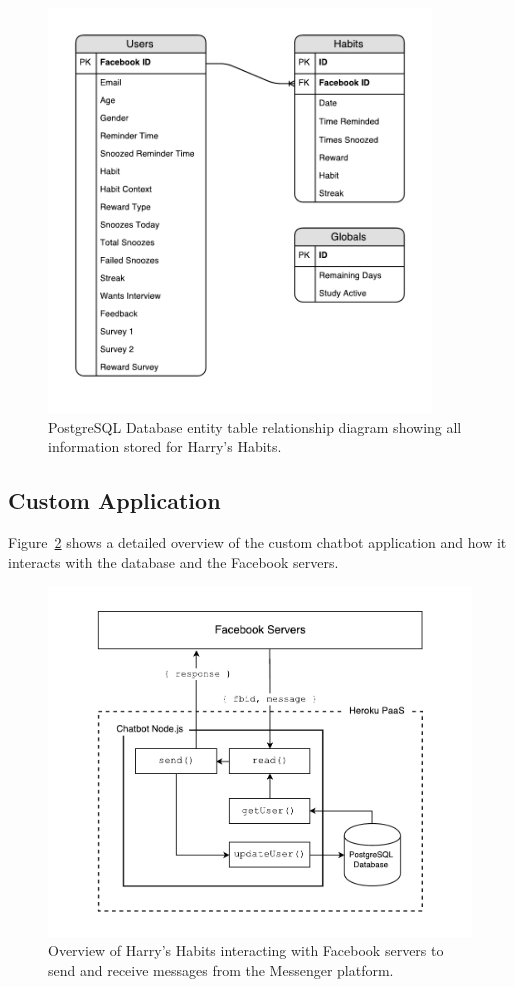 \begin{figure}[H]
    \centering
    \includegraphics[width=4in]{../resources/diagrams/database-diagram.pdf}
    \caption{PostgreSQL Database entity table relationship diagram showing all information stored for Harry's Habits.}
    \label{fig:db_diagram}
\end{figure}


\subsection{Custom Application}
Figure~\ref{fig:prototype_detailed_overview} shows a detailed overview of the custom chatbot application and how it interacts with the database and the Facebook servers.

\begin{figure}[H]
    \centering
    \includegraphics[width=6in]{../resources/diagrams/chatbot-detailed-overview.pdf}
    \caption{Overview of Harry's Habits interacting with Facebook servers to send and receive messages from the Messenger platform.}
    \label{fig:prototype_detailed_overview}
\end{figure}


